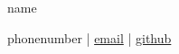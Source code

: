 \documentclass[11pt]{article}       %
\begin{document}
\centerline{\Huge {{name}}}

\vspace{5pt}

\centerline{
{{phonenumber}} | 
\href{mailto:name@gmail.com}{ {{email}}}  | 
\href{ {{"https://"+github}}}{ {{github}}}
}

\vspace{-17pt}


\section*{}



\vspace{-18.5pt}
\end{document}
